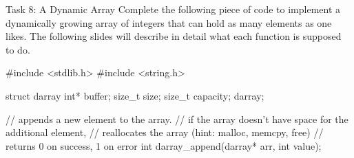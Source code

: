 \documentclass[10pt,graphics,aspectratio=169,table]{beamer}
\begin{document}
\begin{frame}[fragile]{Task 8: A Dynamic Array}
    Complete the following piece of code to implement a dynamically growing
    array of integers that can hold as many elements as one likes.
    The following slides will describe in detail what each function is
    supposed to do.
    \begin{codeblock}
#include <stdlib.h>
#include <string.h>

struct darray{
    int* buffer;
    size_t size;
    size_t capacity;
}darray;

    \end{codeblock}
\end{frame}

\begin{frame}
    \begin{codeblock}
        // appends a new element to the array.
        // if the array doesn't have space for the additional element,
        // reallocates the array (hint: malloc, memcpy, free)
        // returns 0 on success, 1 on error
        int darray_append(darray* arr, int value);
    \end{codeblock}
\end{frame}
\end{document}
